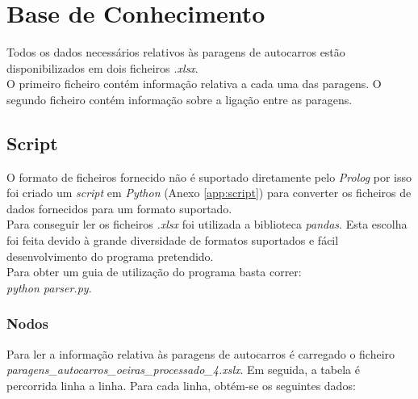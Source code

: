 \documentclass[a4paper]{report}
\begin{document}
\chapter{Base de Conhecimento}
Todos os dados necessários relativos às paragens de autocarros estão
disponibilizados em dois ficheiros \textit{.xlsx}.\\
O primeiro ficheiro contém informação relativa a cada uma das paragens. O
segundo ficheiro contém informação sobre a ligação entre as paragens.\\

\section{Script}
O formato de ficheiros fornecido não é suportado diretamente pelo
\textit{Prolog} por isso foi criado um \textit{script} em \textit{Python}
(Anexo \ref{app:script}) para converter os ficheiros de dados fornecidos para um
formato suportado.\\
Para conseguir ler os ficheiros \textit{.xlsx} foi utilizada a biblioteca
\textit{pandas}. Esta escolha foi feita devido à grande diversidade de formatos
suportados e fácil desenvolvimento do programa pretendido.\\
Para obter um guia de utilização do programa basta correr:\\
\textit{python
parser.py}.

\subsection{Nodos}
Para ler a informação relativa às paragens de autocarros é carregado o ficheiro
\textit{paragens\_autocarros\_oeiras\_processado\_4.xslx}. Em seguida, a tabela
é percorrida linha a linha. Para cada linha, obtém-se os seguintes dados:
\end{document}
